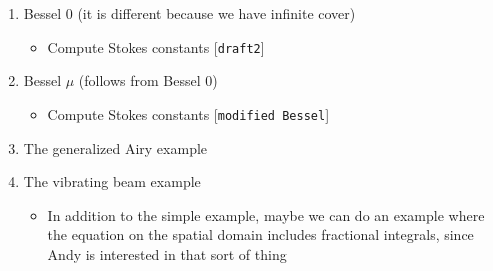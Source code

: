 \documentclass{article}
\begin{document}
\begin{enumerate}
\begin{enumerate}
\begin{itemize}
\end{itemize}
\item Bessel 0 (it is different because we have infinite cover)
\begin{itemize}
\item Compute Stokes constants [{\tt draft2}]
\end{itemize}
\item Bessel $\mu$ (follows from Bessel 0)
\begin{itemize}
\item Compute Stokes constants [{\tt modified Bessel}]
\end{itemize}
\item The generalized Airy example
\item The vibrating beam example
\begin{itemize}
\item In addition to the simple example, maybe we can do an example where the equation on the spatial domain includes fractional integrals, since Andy is interested in that sort of thing
\end{itemize}
\end{enumerate}
\end{enumerate}



\end{document}
